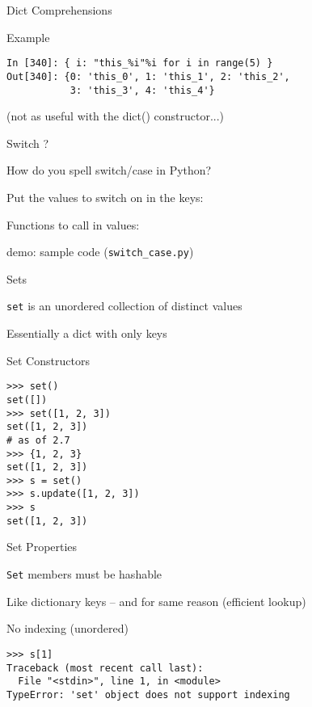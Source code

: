 \documentclass{beamer}
\begin{document}
\begin{frame}[fragile]{Dict Comprehensions}

{\Large Example}

\begin{verbatim}
In [340]: { i: "this_%i"%i for i in range(5) }
Out[340]: {0: 'this_0', 1: 'this_1', 2: 'this_2',
           3: 'this_3', 4: 'this_4'}
\end{verbatim}

\vfill
(not as useful with the dict() constructor...)
\end{frame} 

\begin{frame}[fragile]{Switch ?}

{\Large How do you spell switch/case in Python?}

\vfill
{\Large Put the values to switch on in the keys:}

\vfill
{\Large Functions to call in values:}

\vfill
demo: sample code (\verb|switch_case.py|)
\end{frame} 


\begin{frame}[fragile]{ Sets }

\vfill
{\Large \verb|set| is an unordered collection of distinct values}

\vfill
{\Large Essentially a dict with only keys}

\vfill

\end{frame} 

\begin{frame}[fragile]{Set Constructors}

\vfill
\begin{verbatim}
>>> set()
set([])
>>> set([1, 2, 3])
set([1, 2, 3])
# as of 2.7
>>> {1, 2, 3}
set([1, 2, 3])
>>> s = set()
>>> s.update([1, 2, 3])
>>> s
set([1, 2, 3])
\end{verbatim}
\vfill

\end{frame}

\begin{frame}[fragile]{ Set Properties}

\vfill
{\Large \verb|Set| members must be hashable}

\vfill
{\Large Like dictionary keys -- and for same reason (efficient lookup)}

\vfill
{\Large No indexing (unordered) }

\vfill
\begin{verbatim}
>>> s[1]
Traceback (most recent call last):
  File "<stdin>", line 1, in <module>
TypeError: 'set' object does not support indexing
\end{verbatim}

\vfill
\end{frame} 
\end{document}
